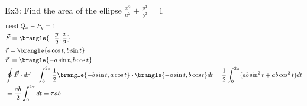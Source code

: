 Ex3: Find the area of the ellipse $\frac{x^2}{a^2}+\frac{y^2}{b^2}=1$
\begin{align*}
    &\text{need }Q_x-P_y=1\\
    &\vec{F}=\brangle{-\frac{y}{2},\frac{x}{2}}\\
    &\vec{r}=\brangle{a\cos t,b\sin t}\\
    &\vec{r}'=\brangle{-a\sin t,b\cos t}\\
    &\oint\vec{F}\cdot d\vec{r}=\int_0^{2\pi}\frac{1}{2}\brangle{-b\sin t,a\cos t}\cdot\brangle{-a\sin t,b\cos t}dt=\frac{1}{2}\int_0^{2\pi}(ab\sin^2t+ab\cos^2t)dt\\
    &=\frac{ab}{2}\int_0^{2\pi}dt=\pi ab
\end{align*}